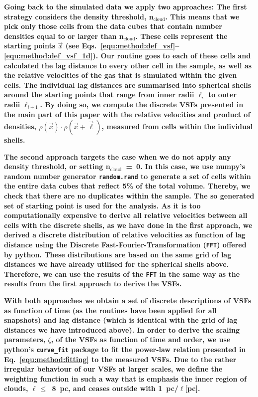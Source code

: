 \textbf{
    Going back to the simulated data we apply two approaches: 
    The first strategy considers the density threshold, n$_\mathrm{cloud}$.
    This means that we pick only those cells from the data cubes that contain number densities equal to or larger than n$_\mathrm{cloud}$.
    These cells represent the starting points $\vec{x}$ (see Eqs.~\ref{equ:method:def_vsf}--\ref{equ:method:def_vsf_1d}).
    Our routine goes to each of these cells and calculated the lag distance to every other cell in the sample, as well as the relative velocities of the gas that is simulated within the given cells. 
    The individual lag distances are summarised into spherical shells around the starting points that range from inner radii $\ell_{i}$ to outer radii $\ell_{i+1}$. 
    By doing so, we compute the discrete VSFs presented in the main part of this paper with the relative velocities and product of densities, $\rho(\vec{x}) \cdot \rho(\vec{x}+\vec{\ell})$, measured from cells within the individual shells.
}

\textbf{
    The second approach targets the case when we do not apply any density threshold, or setting n$_\mathrm{cloud}$~=~0.
    In this case, we use numpy's random number generator \texttt{random.rand} to generate a set of cells within the entire data cubes that reflect 5\% of the total volume. 
    Thereby, we check that there are no duplicates within the sample.
    The so generated set of starting point is used for the analysis.
    As it is too computationally expensive to derive all relative velocities between all cells with the discrete shells, as we have done in the first approach, we derived a discrete distribution of relative velocities as function of lag distance using the Discrete Fast-Fourier-Transformation (\texttt{FFT}) offered by python.
    These distributions are based on the same grid of lag distances we have already utilised for the spherical shells above.
    Therefore, we can use the results of the \texttt{FFT} in the same way as the results from the first approach to derive the VSFs.
}

\textbf{
    With both approaches we obtain a set of discrete descriptions of VSFs as function of time (as the routines have been applied for all snapshots) and lag distance (which is identical with the grid of lag distances we have introduced above).
    In order to derive the scaling parameters, $\zeta$, of the VSFs as function of time and order, we use python's \texttt{curve\_fit} package to fit the power-law relation presented in Eq.~\ref{equ:method:fitting} to the measured VSFs.
    Due to the rather irregular behaviour of our VSFs at larger scales, we define the weighting function in such a way that is emphasis the inner region of clouds, $\ell\,\leq$~8~pc, and ceases outside with 1~pc/$\ell$[pc]. 
}

